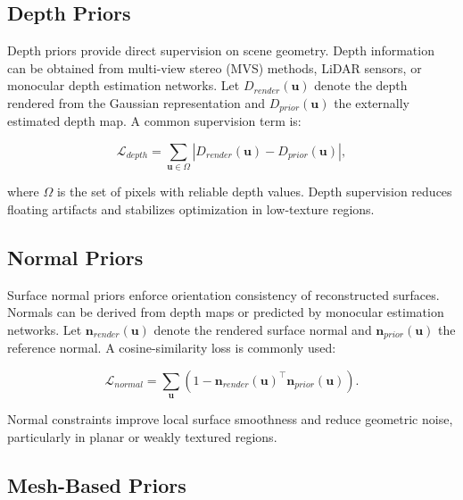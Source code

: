 \subsection{Depth Priors}

Depth priors provide direct supervision on scene geometry. Depth information can be obtained from multi-view stereo (MVS) methods, LiDAR sensors, or monocular depth estimation networks. Let $D_{render}(\mathbf{u})$ denote the depth rendered from the Gaussian representation and $D_{prior}(\mathbf{u})$ the externally estimated depth map. A common supervision term is:

\begin{equation}
\mathcal{L}_{depth}
=
\sum_{\mathbf{u} \in \Omega}
\left|
D_{render}(\mathbf{u}) - D_{prior}(\mathbf{u})
\right|,
\end{equation}

where $\Omega$ is the set of pixels with reliable depth values. Depth supervision reduces floating artifacts and stabilizes optimization in low-texture regions.

\subsection{Normal Priors}

Surface normal priors enforce orientation consistency of reconstructed surfaces. Normals can be derived from depth maps or predicted by monocular estimation networks. Let $\mathbf{n}_{render}(\mathbf{u})$ denote the rendered surface normal and $\mathbf{n}_{prior}(\mathbf{u})$ the reference normal. A cosine-similarity loss is commonly used:

\begin{equation}
\mathcal{L}_{normal}
=
\sum_{\mathbf{u}}
\left(
1 -
\mathbf{n}_{render}(\mathbf{u})^\top
\mathbf{n}_{prior}(\mathbf{u})
\right).
\end{equation}

Normal constraints improve local surface smoothness and reduce geometric noise, particularly in planar or weakly textured regions.

\subsection{Mesh-Based Priors}

